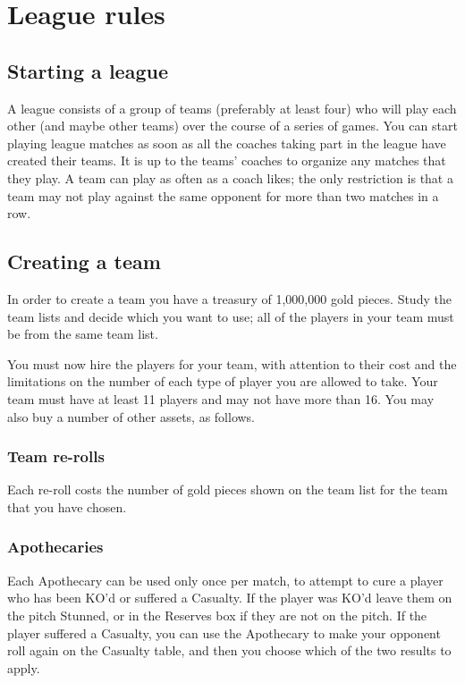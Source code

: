 \section{League rules}

\subsection{Starting a league}
\par A league consists of a group of teams (preferably at least four) who will play each other (and maybe other teams) over the course of a series of games. You can start playing league matches as soon as all the coaches taking part in the league have created their teams. It is up to the teams' coaches to organize any matches that they play. A team can play as often as a coach likes; the only restriction is that a team may not play against the same opponent for more than two matches in a row.

\subsection{Creating a team}
\par In order to create a team you have a treasury of 1,000,000 gold pieces. Study the team lists and decide which you want to use; all of the players in your team must be from the same team list.
\par You must now hire the players for your team, with attention to their cost and the limitations on the number of each type of player you are allowed to take. Your team must have at least 11 players and may not have more than 16. You may also buy a number of other assets, as follows.

\subsubsection{Team re-rolls}
\par Each re-roll costs the number of gold pieces shown on the team list for the team that you have chosen.

\subsubsection{Apothecaries}
\par Each Apothecary can be used only once per match, to attempt to cure a player who has been KO'd or suffered a Casualty. If the player was KO'd leave them on the pitch Stunned, or in the Reserves box if they are not on the pitch. If the player suffered a Casualty, you can use the Apothecary to make your opponent roll again on the Casualty table, and then you choose which of the two results to apply.

